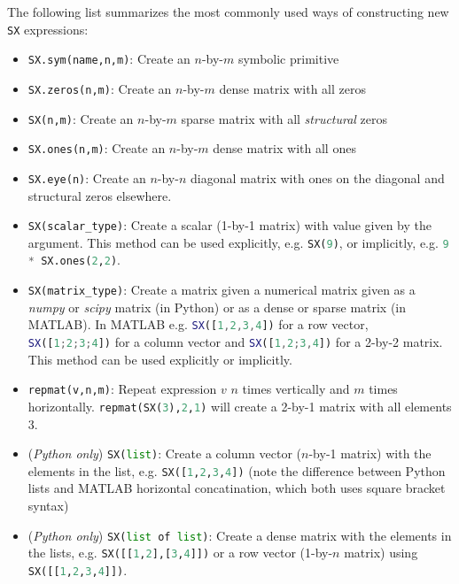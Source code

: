 \documentclass[a4paper,12pt]{book}
\begin{document}
The following list summarizes the most commonly used ways of constructing new \texttt{SX} expressions:
\begin{itemize}
  \item \lstinline[language=Python]{SX.sym(name,n,m)}: Create an $n$-by-$m$ symbolic primitive
  \item \lstinline[language=Python]{SX.zeros(n,m)}: Create an $n$-by-$m$ dense matrix with all zeros
  \item \lstinline[language=Python]{SX(n,m)}: Create an $n$-by-$m$ sparse matrix with all \emph{structural} zeros
  \item \lstinline[language=Python]{SX.ones(n,m)}: Create an $n$-by-$m$ dense matrix with all ones
  \item \lstinline[language=Python]{SX.eye(n)}: Create an $n$-by-$n$ diagonal matrix with ones on the diagonal and structural zeros elsewhere.
  \item \lstinline[language=Python]{SX(scalar_type)}: Create a scalar (1-by-1 matrix) with value given by the argument. This method can be used explicitly, e.g. \lstinline[language=Python]{SX(9)}, or implicitly, e.g. \lstinline[language=Python]{9 * SX.ones(2,2)}.
  \item \lstinline[language=Python]{SX(matrix_type)}: Create a matrix given a numerical matrix given as a \emph{numpy} or \emph{scipy} matrix (in Python) or as a dense or sparse matrix (in MATLAB). In MATLAB e.g.
  \lstinline[language=Matlab]{SX([1,2,3,4])} for a row vector, \lstinline[language=Matlab]{SX([1;2;3;4])} for a column vector and \lstinline[language=Matlab]{SX([1,2;3,4])} for a 2-by-2 matrix. This method can be used explicitly or implicitly.
  \item \lstinline[language=Python]{repmat(v,n,m)}: Repeat expression $v$ $n$ times vertically and $m$ times horizontally. \lstinline[language=Python]{repmat(SX(3),2,1)} will create a 2-by-1 matrix with all elements 3.
  \item (\emph{Python only}) \lstinline[language=Python]{SX(list)}: Create a column vector ($n$-by-1 matrix) with the elements in the list, e.g. \lstinline[language=Python]{SX([1,2,3,4])} (note the difference between Python lists and MATLAB horizontal concatination, which both uses square bracket syntax)
  \item (\emph{Python only}) \lstinline[language=Python]{SX(list of list)}: Create a dense matrix with the elements in the lists, e.g. \lstinline[language=Python]{SX([[1,2],[3,4]])} or a row vector (1-by-$n$ matrix) using \lstinline[language=Python]{SX([[1,2,3,4]])}.
\end{itemize}
\end{document}
